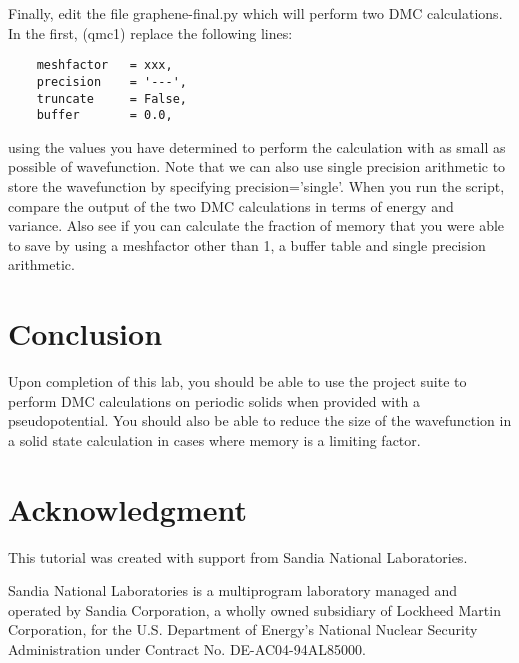 Finally, edit the file graphene-final.py which will perform two DMC calculations.  In the first, (qmc1) replace the following lines:
\begin{lstlisting}
    meshfactor   = xxx,
    precision    = '---',
    truncate     = False,
    buffer       = 0.0,
\end{lstlisting}
using the values you have determined to perform the calculation with as small as possible of wavefunction.  Note that we can also use single precision arithmetic to store the wavefunction by specifying precision='single'.  When you run the script, compare the output of the two DMC calculations in terms of energy and variance.  Also see if you can calculate the fraction of memory that you were able to save by using a meshfactor other than 1, a buffer table and single precision arithmetic.

\section{Conclusion}
Upon completion of this lab, you should be able to use the project suite to perform DMC calculations on periodic solids when provided with a pseudopotential.  You should also be able to reduce the size of the wavefunction in a solid state calculation in cases where memory is a limiting factor.

\section{Acknowledgment}
 This tutorial was created with support from Sandia National Laboratories.

 Sandia National Laboratories is a multiprogram laboratory managed and operated by
 Sandia Corporation, a wholly owned subsidiary of Lockheed Martin Corporation, for
 the U.S. Department of Energy's National Nuclear Security Administration under
 Contract No. DE-AC04-94AL85000.
